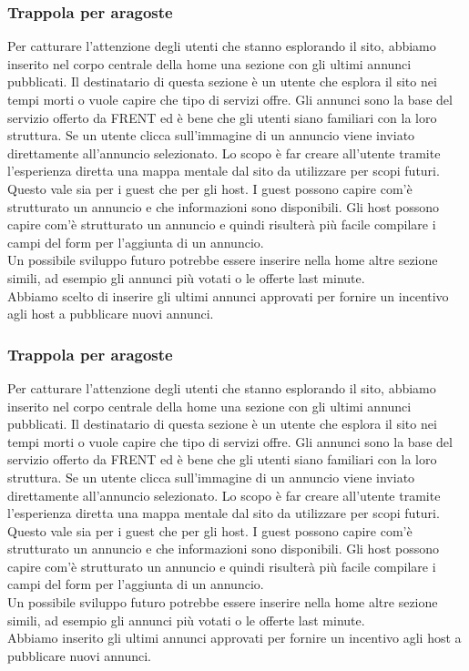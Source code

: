 \documentclass[1_relazione.tex]{subfiles}
\begin{document}
\subsubsection{Trappola per aragoste} 
Per catturare l'attenzione degli utenti che stanno esplorando il sito, abbiamo inserito nel corpo centrale della home una sezione con gli ultimi annunci pubblicati. Il destinatario di questa sezione è un utente che esplora il sito nei tempi morti o vuole capire che tipo di servizi offre. Gli annunci sono la base del servizio offerto da FRENT ed è bene che gli utenti siano familiari con la loro struttura. Se un utente clicca sull'immagine di un annuncio viene inviato direttamente all'annuncio selezionato. Lo scopo \`{e} far creare all'utente tramite l'esperienza diretta una mappa mentale dal sito da utilizzare per scopi futuri. \\
Questo vale sia per i guest che per gli host. I guest possono capire com'\`{e} strutturato un annuncio e che informazioni sono disponibili. Gli host possono capire com'\`{e} strutturato un annuncio e quindi risulter\`{a} pi\`{u} facile compilare i campi del form per l'aggiunta di un annuncio. \\
Un possibile sviluppo futuro potrebbe essere inserire nella home altre sezione simili, ad esempio gli annunci pi\`{u} votati o le offerte last minute.\\ Abbiamo scelto di inserire gli ultimi annunci approvati per fornire un incentivo agli host a pubblicare nuovi annunci. \\

    \subsubsection{Trappola per aragoste}
    Per catturare l'attenzione degli utenti che stanno esplorando il sito, abbiamo inserito nel corpo centrale della home una sezione con gli ultimi annunci pubblicati. Il destinatario di questa sezione è un utente che esplora il sito nei tempi morti o vuole capire che tipo di servizi offre. Gli annunci sono la base del servizio offerto da FRENT ed è bene che gli utenti siano familiari con la loro struttura. Se un utente clicca sull'immagine di un annuncio viene inviato direttamente all'annuncio selezionato. Lo scopo \`{e} far creare all'utente tramite l'esperienza diretta una mappa mentale dal sito da utilizzare per scopi futuri. \\
    Questo vale sia per i guest che per gli host. I guest possono capire com'\`{e} strutturato un annuncio e che informazioni sono disponibili. Gli host possono capire com'\`{e} strutturato un annuncio e quindi risulter\`{a} pi\`{u} facile compilare i campi del form per l'aggiunta di un annuncio. \\
    Un possibile sviluppo futuro potrebbe essere inserire nella home altre sezione simili, ad esempio gli annunci pi\`{u} votati o le offerte last minute.\\ Abbiamo inserito gli ultimi annunci approvati per fornire un incentivo agli host a pubblicare nuovi annunci. \\
\end{document}
